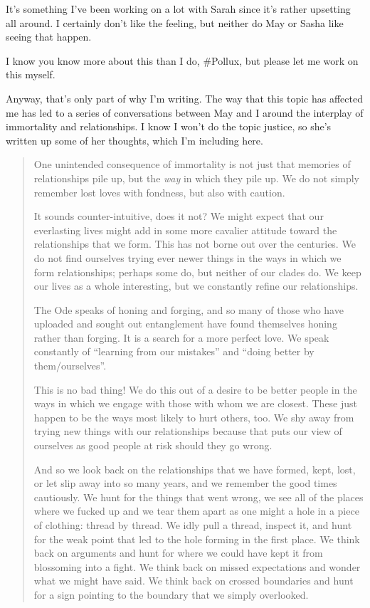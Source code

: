 It's something I've been working on a lot with Sarah since it's rather upsetting all around. I certainly don't like the feeling, but neither do May or Sasha like seeing that happen.

I know you know more about this than I do, \#Pollux, but please let me work on this myself.

Anyway, that's only part of why I'm writing. The way that this topic has affected me has led to a series of conversations between May and I around the interplay of immortality and relationships. I know I won't do the topic justice, so she's written up some of her thoughts, which I'm including here.

\begin{quote}
One unintended consequence of immortality is not just that memories of relationships pile up, but the \emph{way} in which they pile up. We do not simply remember lost loves with fondness, but also with caution.

It sounds counter-intuitive, does it not? We might expect that our everlasting lives might add in some more cavalier attitude toward the relationships that we form. This has not borne out over the centuries. We do not find ourselves trying ever newer things in the ways in which we form relationships; perhaps some do, but neither of our clades do. We keep our lives as a whole interesting, but we constantly refine our relationships.

The Ode speaks of honing and forging, and so many of those who have uploaded and sought out entanglement have found themselves honing rather than forging. It is a search for a more perfect love. We speak constantly of ``learning from our mistakes'' and ``doing better by them/ourselves''.

This is no bad thing! We do this out of a desire to be better people in the ways in which we engage with those with whom we are closest. These just happen to be the ways most likely to hurt others, too. We shy away from trying new things with our relationships because that puts our view of ourselves as good people at risk should they go wrong.

And so we look back on the relationships that we have formed, kept, lost, or let slip away into so many years, and we remember the good times cautiously. We hunt for the things that went wrong, we see all of the places where we fucked up and we tear them apart as one might a hole in a piece of clothing: thread by thread. We idly pull a thread, inspect it, and hunt for the weak point that led to the hole forming in the first place. We think back on arguments and hunt for where we could have kept it from blossoming into a fight. We think back on missed expectations and wonder what we might have said. We think back on crossed boundaries and hunt for a sign pointing to the boundary that we simply overlooked.


\end{quote}

